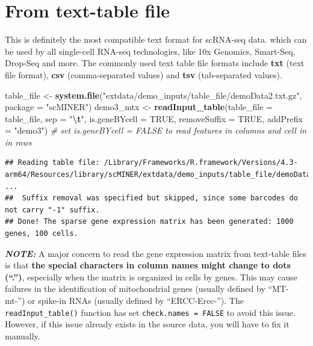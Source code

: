 \documentclass[
  12pt,
]{book}
\newenvironment{Shaded}{\begin{snugshade}}{\end{snugshade}}
\newcommand{\AttributeTok}[1]{\textcolor[rgb]{0.13,0.29,0.53}{#1}}
\newcommand{\CommentTok}[1]{\textcolor[rgb]{0.56,0.35,0.01}{\textit{#1}}}
\newcommand{\ConstantTok}[1]{\textcolor[rgb]{0.56,0.35,0.01}{#1}}
\newcommand{\FunctionTok}[1]{\textcolor[rgb]{0.13,0.29,0.53}{\textbf{#1}}}
\newcommand{\NormalTok}[1]{#1}
\newcommand{\OtherTok}[1]{\textcolor[rgb]{0.56,0.35,0.01}{#1}}
\newcommand{\SpecialCharTok}[1]{\textcolor[rgb]{0.81,0.36,0.00}{\textbf{#1}}}
\newcommand{\StringTok}[1]{\textcolor[rgb]{0.31,0.60,0.02}{#1}}
\begin{document}
\section{From text-table file}\label{from-text-table-file}

This is definitely the most compatible text format for scRNA-seq data. which can be used by all single-cell RNA-seq technologies, like 10x Genomics, Smart-Seq, Drop-Seq and more. The commonly used text table file formats include \textbf{txt} (text file format), \textbf{csv} (comma-separated values) and \textbf{tsv} (tab-separated values).

\begin{Shaded}
\begin{Highlighting}[]
\NormalTok{table\_file }\OtherTok{\textless{}{-}} \FunctionTok{system.file}\NormalTok{(}\StringTok{"extdata/demo\_inputs/table\_file/demoData2.txt.gz"}\NormalTok{, }\AttributeTok{package =} \StringTok{"scMINER"}\NormalTok{)}
\NormalTok{demo3\_mtx }\OtherTok{\textless{}{-}} \FunctionTok{readInput\_table}\NormalTok{(}\AttributeTok{table\_file =}\NormalTok{ table\_file, }\AttributeTok{sep =} \StringTok{"}\SpecialCharTok{\textbackslash{}t}\StringTok{"}\NormalTok{, }\AttributeTok{is.geneBYcell =} \ConstantTok{TRUE}\NormalTok{, }\AttributeTok{removeSuffix =} \ConstantTok{TRUE}\NormalTok{, }\AttributeTok{addPrefix =} \StringTok{"demo3"}\NormalTok{) }\CommentTok{\# set is.geneBYcell = FALSE to read features in columns and cell in in rows}
\end{Highlighting}
\end{Shaded}

\begin{verbatim}
## Reading table file: /Library/Frameworks/R.framework/Versions/4.3-arm64/Resources/library/scMINER/extdata/demo_inputs/table_file/demoData2.txt.gz ...
##  Suffix removal was specified but skipped, since some barcodes do not carry "-1" suffix.
## Done! The sparse gene expression matrix has been generated: 1000 genes, 100 cells.
\end{verbatim}

\textbf{\emph{NOTE:}} A major concern to read the gene expression matrix from text-table files is that \textbf{the special characters in column names might change to dots (``.'')}, especially when the matrix is organized in cells by genes. This may cause failures in the identification of mitochondrial genes (usually defined by ``MT-\textbar mt-'') or spike-in RNAs (usually defined by ``ERCC-\textbar Ercc-''). The \texttt{readInput\_table()} function has set \texttt{check.names\ =\ FALSE} to avoid this issue. However, if this issue already exists in the source data, you will have to fix it manually.
\end{document}
